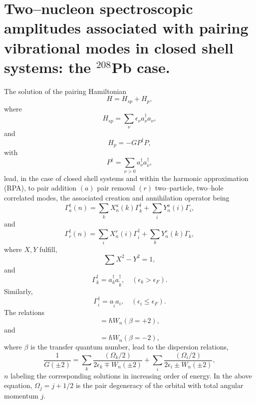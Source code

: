 \section[Pair vibration spectroscopic amplitudes]{Two--nucleon spectroscopic amplitudes associated with pairing vibrational modes in closed shell systems: the $^{208}$Pb case.}\label{App1E}
The solution of the pairing Hamiltonian
\begin{equation*}
H=H_{sp}+H_p,
\end{equation*}
where
\begin{equation*}
H_{sp}=\sum_{\nu}\epsilon_\nu a_\nu^\dagger a_\nu,
\end{equation*}
and 
\begin{equation*}
H_p=-GP^\dagger P,
\end{equation*}
with
\begin{equation*}
P^\dagger=\sum_{\nu>0}a_\nu^\dagger a_{\bar \nu}^\dagger,
\end{equation*}
lead, in the case of closed shell systems and within the harmonic approximation (RPA), to pair addition $(a)$ pair removal $(r)$ two--particle, two--hole correlated modes, the associated creation and annihilation operator being
\begin{equation*}
\Gamma_a^\dagger(n)=\sum_k X_n^a(k)\Gamma_k^\dagger+\sum_iY^a_n(i)\Gamma_i,
\end{equation*}
and
\begin{equation*}
\Gamma_r^\dagger(n)=\sum_i X_n^r(i)\Gamma_i^\dagger+\sum_kY^r_n(k)\Gamma_k,
\end{equation*}
where $X,Y$ fulfill,
\begin{equation*}
\sum X^2-Y^2=1,
\end{equation*}
and
\begin{equation*}
\Gamma_k^\dagger=a_k^\dagger a_{\tilde k}^\dagger,\quad (\epsilon_k>\epsilon_F).
\end{equation*}
Similarly,
\begin{equation*}
\Gamma_i^\dagger=a_{\tilde i} a_i ,\quad (\epsilon_i\leq\epsilon_F).
\end{equation*}
The relations
\begin{equation*}
[H,\Gamma_a^\dagger(n)]=\hbar W_n (\beta=+2),
\end{equation*}
and
\begin{equation*}
[H,\Gamma_r^\dagger(n)]=\hbar W_n (\beta=-2),
\end{equation*}
where $\beta$ is the transfer quantum number, lead to the dispersion relations, 
\begin{equation*}
\frac{1}{G(\pm2)}=\sum_k \frac{(\Omega_k/2)}{2\epsilon_k\mp W_n(\pm2)}+\sum_i \frac{(\Omega_i/2)}{2\epsilon_i\pm W_n(\pm2)},
\end{equation*}
$n$ labeling the corresponding solutions in increasing order of energy. In the above equation, $\Omega_j=j+1/2$ is the pair degeneracy of the orbital with total angular momentum $j$.

